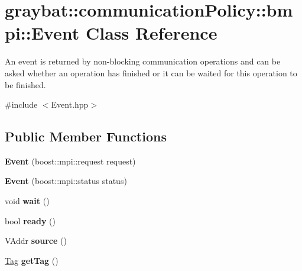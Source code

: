 \hypertarget{classgraybat_1_1communicationPolicy_1_1bmpi_1_1Event}{}\section{graybat\+:\+:communication\+Policy\+:\+:bmpi\+:\+:Event Class Reference}
\label{classgraybat_1_1communicationPolicy_1_1bmpi_1_1Event}


An event is returned by non-\/blocking communication operations and can be asked whether an operation has finished or it can be waited for this operation to be finished.  




{\ttfamily \#include $<$Event.\+hpp$>$}

\subsection*{Public Member Functions}
\begin{DoxyCompactItemize}
\item 
\hypertarget{classgraybat_1_1communicationPolicy_1_1bmpi_1_1Event_a20cd519a889f6ce978315c07bd6ba46f}{}{\bfseries Event} (boost\+::mpi\+::request request)\label{classgraybat_1_1communicationPolicy_1_1bmpi_1_1Event_a20cd519a889f6ce978315c07bd6ba46f}

\item 
\hypertarget{classgraybat_1_1communicationPolicy_1_1bmpi_1_1Event_a371ec9f255077d627a4a0eee1cc94d63}{}{\bfseries Event} (boost\+::mpi\+::status status)\label{classgraybat_1_1communicationPolicy_1_1bmpi_1_1Event_a371ec9f255077d627a4a0eee1cc94d63}

\item 
\hypertarget{classgraybat_1_1communicationPolicy_1_1bmpi_1_1Event_a5de95b71b347ff7dd3bf3b86d5528cd0}{}void {\bfseries wait} ()\label{classgraybat_1_1communicationPolicy_1_1bmpi_1_1Event_a5de95b71b347ff7dd3bf3b86d5528cd0}

\item 
\hypertarget{classgraybat_1_1communicationPolicy_1_1bmpi_1_1Event_a6d161e5969b560aaaf4f1c62dd2afd2e}{}bool {\bfseries ready} ()\label{classgraybat_1_1communicationPolicy_1_1bmpi_1_1Event_a6d161e5969b560aaaf4f1c62dd2afd2e}

\item 
\hypertarget{classgraybat_1_1communicationPolicy_1_1bmpi_1_1Event_a517cad88bf98fb98c9845309a68d656c}{}V\+Addr {\bfseries source} ()\label{classgraybat_1_1communicationPolicy_1_1bmpi_1_1Event_a517cad88bf98fb98c9845309a68d656c}

\item 
\hypertarget{classgraybat_1_1communicationPolicy_1_1bmpi_1_1Event_a77aba95207f3b9a5e755c4ea42e3589d}{}\hyperlink{structTag}{Tag} {\bfseries get\+Tag} ()\label{classgraybat_1_1communicationPolicy_1_1bmpi_1_1Event_a77aba95207f3b9a5e755c4ea42e3589d}

\end{DoxyCompactItemize}


